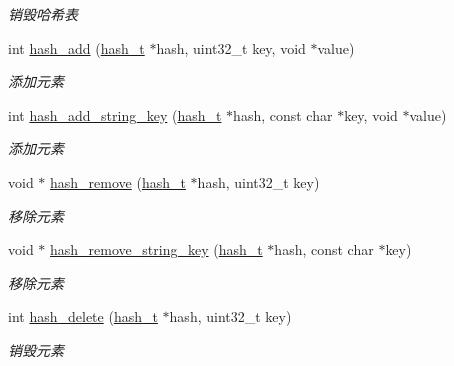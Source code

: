 \begin{DoxyCompactItemize}
\begin{DoxyCompactList}\small\item\em 销毁哈希表 \end{DoxyCompactList}\item 
int \hyperlink{a00056_aa74d5b564965d7d3f162eb5308bc9b3f_aa74d5b564965d7d3f162eb5308bc9b3f}{hash\+\_\+add} (\hyperlink{a00047_a188677c3015513590ab998e96b999966_a188677c3015513590ab998e96b999966}{hash\+\_\+t} $\ast$hash, uint32\+\_\+t key, void $\ast$value)
\begin{DoxyCompactList}\small\item\em 添加元素 \end{DoxyCompactList}\item 
int \hyperlink{a00056_ad5b36fd89c94138d38be050314d922ed_ad5b36fd89c94138d38be050314d922ed}{hash\+\_\+add\+\_\+string\+\_\+key} (\hyperlink{a00047_a188677c3015513590ab998e96b999966_a188677c3015513590ab998e96b999966}{hash\+\_\+t} $\ast$hash, const char $\ast$key, void $\ast$value)
\begin{DoxyCompactList}\small\item\em 添加元素 \end{DoxyCompactList}\item 
void $\ast$ \hyperlink{a00056_acef10836aec4eab1b2197ecaad759b34_acef10836aec4eab1b2197ecaad759b34}{hash\+\_\+remove} (\hyperlink{a00047_a188677c3015513590ab998e96b999966_a188677c3015513590ab998e96b999966}{hash\+\_\+t} $\ast$hash, uint32\+\_\+t key)
\begin{DoxyCompactList}\small\item\em 移除元素 \end{DoxyCompactList}\item 
void $\ast$ \hyperlink{a00056_a054f507d00a4f813455dafffe29202d1_a054f507d00a4f813455dafffe29202d1}{hash\+\_\+remove\+\_\+string\+\_\+key} (\hyperlink{a00047_a188677c3015513590ab998e96b999966_a188677c3015513590ab998e96b999966}{hash\+\_\+t} $\ast$hash, const char $\ast$key)
\begin{DoxyCompactList}\small\item\em 移除元素 \end{DoxyCompactList}\item 
int \hyperlink{a00056_ac5915f1a7177380272fbb014080217c8_ac5915f1a7177380272fbb014080217c8}{hash\+\_\+delete} (\hyperlink{a00047_a188677c3015513590ab998e96b999966_a188677c3015513590ab998e96b999966}{hash\+\_\+t} $\ast$hash, uint32\+\_\+t key)
\begin{DoxyCompactList}\small\item\em 销毁元素 \end{DoxyCompactList}\item 

\end{DoxyCompactItemize}
